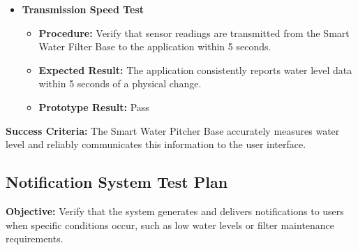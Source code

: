 \begin{itemize}
\item \textbf{Transmission Speed Test}
\begin{itemize}
\item \textbf{Procedure:} Verify that sensor readings are transmitted from the Smart Water Filter Base to the application within 5 seconds.
\item \textbf{Expected Result:} The application consistently reports water level data within 5 seconds of a physical change.
\item \textbf{Prototype Result:} Pass
\end{itemize}

\end{itemize}

\noindent{}\textbf{Success Criteria:}
The Smart Water Pitcher Base accurately measures water level and reliably communicates this information to the user interface.



\subsection*{Notification System Test Plan}

\noindent{}\textbf{Objective:}
Verify that the system generates and delivers notifications to users when specific conditions occur, such as low water levels or filter maintenance requirements.\\

